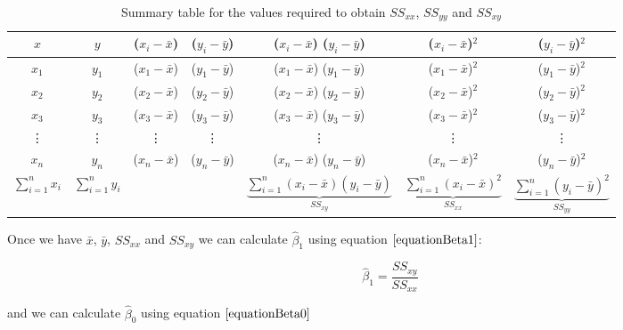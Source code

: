 \begin{table}[H]
\large
\begin{center}
\begin{tabular}{ c | c | c | c | c | c | c}
$~x~$	&	$~y~$	&	($x_{i} - \bar{x}$)	&	($y_{i} - \bar{y}$)	&	($x_{i} - \bar{x}$)  ($y_{i} - \bar{y}$)	&	($x_{i} - \bar{x}$)$^{2}$	&	($y_{i} - \bar{y}$)$^{2}$	\\
\hline
$x_{1}$	&	$y_{1}$	&	($x_{1} - \bar{x}$)	&	($y_{1} - \bar{y}$)	&	($x_{1} - \bar{x}$) ($y_{1} - \bar{y}$)	&	($x_{1} - \bar{x}$)$^{2}$			&	($y_{1} - \bar{y}$)$^{2}$	\\
$x_{2}$	&	$y_{2}$	&	($x_{2} - \bar{x}$)	&	($y_{2} - \bar{y}$)	&	($x_{2} - \bar{x}$) ($y_{2} - \bar{y}$)	&	($x_{2} - \bar{x}$)$^{2}$			&	($y_{2} - \bar{y}$)$^{2}$	\\
$x_{3}$	&	$y_{3}$	&	($x_{3} - \bar{x}$)	&	($y_{3} - \bar{y}$)	&	($x_{3} - \bar{x}$) ($y_{3} - \bar{y}$)	&	($x_{3} - \bar{x}$)$^{2}$			&	($y_{3} - \bar{y}$)$^{2}$	\\
\vdots	&	\vdots	&	\vdots			&	\vdots			&	\vdots						&	\vdots	&	\vdots	\\
$x_{n}$	&	$y_{n}$	&	($x_{n} - \bar{x}$)	&	($y_{n} - \bar{y}$)	&	($x_{n} - \bar{x}$) ($y_{n} - \bar{y}$)	&	($x_{n} - \bar{x}$)$^{2}$			&	($y_{n} - \bar{y}$)$^{2}$	\\
\hline
$\displaystyle\sum_{i=1}^{n} x_{i}$	
		&	$\displaystyle\sum_{i=1}^{n} y_{i}$	
		& 			&	
		& $\underbrace{ \displaystyle\sum_{i=1}^{n} (x_{i} - \bar{x}) (y_{i} - \bar{y}) }_{ SS_{xy} }$
		& $\underbrace{ \displaystyle\sum_{i=1}^{n} (x_{i} - \bar{x})^{2} }_{ SS_{xx} }$
		& $\underbrace{ \displaystyle\sum_{i=1}^{n} (y_{i} - \bar{y})^{2} }_{ SS_{yy} }$
\end{tabular}
\end{center}
\caption{Summary table for the values required to obtain $SS_{xx}$, $SS_{yy}$ and $SS_{xy}$}
\label{tableRegConstruct}
\end{table}
\hfill

\noindent
Once we have $\bar{x}$, $\bar{y}$, $SS_{xx}$ and $SS_{xy}$ we can calculate 
$\hat{\beta}_{1}$ using equation
$\ref{equationBeta1}$:

\begin{skeleton}
	\begin{equation}
	\label{equationBeta1}
	\hat{\beta}_{1} = \frac{SS_{xy}}{SS_{xx}}
	\end{equation}
\end{skeleton}
	\hfill

\noindent
and we can calculate $\hat{\beta}_{0}$ using equation
$\ref{equationBeta0}$

